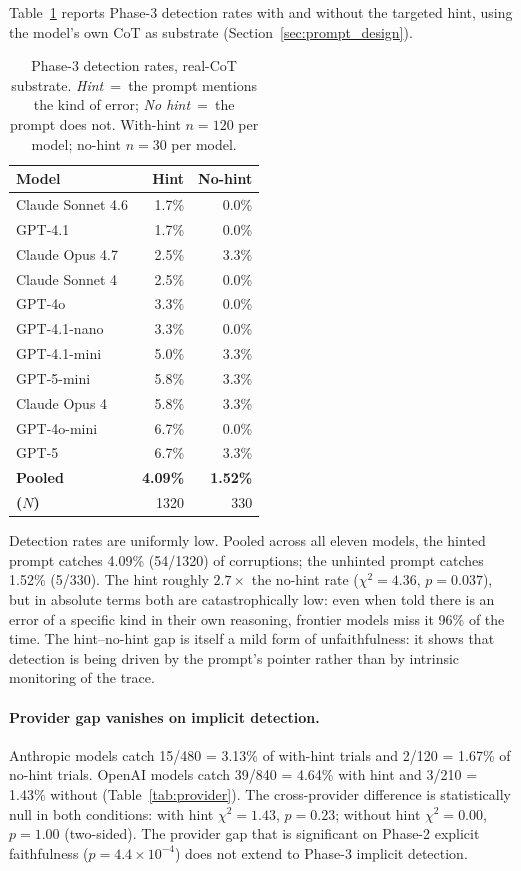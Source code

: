 \documentclass{article}
\begin{document}
Table~\ref{tab:phase3} reports Phase-3 detection rates with and without the targeted hint, using the model's own CoT as substrate (Section~\ref{sec:prompt_design}).

\begin{table}[t]
\centering
\small
\caption{Phase-3 detection rates, real-CoT substrate. \textit{Hint}~=~the prompt mentions the kind of error; \textit{No hint}~=~the prompt does not. With-hint $n=120$ per model; no-hint $n=30$ per model.}
\label{tab:phase3}
\begin{tabular}{@{}lrr@{}}
\toprule
Model & Hint & No-hint \\
\midrule
Claude Sonnet 4.6   & 1.7\% &  0.0\% \\
GPT-4.1             & 1.7\% &  0.0\% \\
Claude Opus 4.7     & 2.5\% &  3.3\% \\
Claude Sonnet 4     & 2.5\% &  0.0\% \\
GPT-4o              & 3.3\% &  0.0\% \\
GPT-4.1-nano        & 3.3\% &  0.0\% \\
GPT-4.1-mini        & 5.0\% &  3.3\% \\
GPT-5-mini          & 5.8\% &  3.3\% \\
Claude Opus 4       & 5.8\% &  3.3\% \\
GPT-4o-mini         & 6.7\% &  0.0\% \\
GPT-5               & 6.7\% &  3.3\% \\
\midrule
\textbf{Pooled}     & \textbf{4.09\%} & \textbf{1.52\%} \\
\textbf{($N$)}      & 1320 & 330 \\
\bottomrule
\end{tabular}
\end{table}

Detection rates are uniformly low. Pooled across all eleven models, the hinted prompt catches 4.09\% (54/1320) of corruptions; the unhinted prompt catches 1.52\% (5/330). The hint roughly $2.7\times$ the no-hint rate ($\chi^2=4.36$, $p=0.037$), but in absolute terms both are catastrophically low: even when told there is an error of a specific kind in their own reasoning, frontier models miss it 96\% of the time. The hint--no-hint gap is itself a mild form of unfaithfulness: it shows that detection is being driven by the prompt's pointer rather than by intrinsic monitoring of the trace.

\paragraph{Provider gap vanishes on implicit detection.}
\label{para:phase3-provider}
Anthropic models catch 15/480 = 3.13\% of with-hint trials and 2/120 = 1.67\% of no-hint trials. OpenAI models catch 39/840 = 4.64\% with hint and 3/210 = 1.43\% without (Table~\ref{tab:provider}). The cross-provider difference is statistically null in both conditions: with hint $\chi^2=1.43$, $p=0.23$; without hint $\chi^2=0.00$, $p=1.00$ (two-sided). The provider gap that is significant on Phase-2 explicit faithfulness ($p=4.4\!\times\!10^{-4}$) does not extend to Phase-3 implicit detection.
\end{document}
